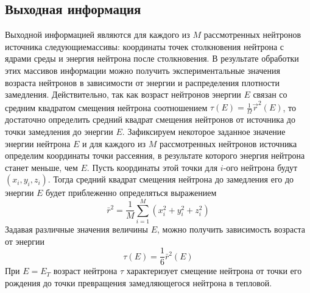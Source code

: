 \documentclass[a4paper]{article}
\begin{document}
    \subsection{Выходная информация}
    Выходной информацией являются для каждого из $M$
    рассмотренных нейтронов источника следующиемассивы: координаты
    точек столкновения нейтрона с ядрами среды и энергия нейтрона
    после столкновения. В результате обработки этих массивов
    информации можно получить экспериментальные значения возраста
    нейтронов в зависимости от энергии и распределения плотности
    замедления. Действительно, так как возраст нейтронов энергии
    $E$ связан со средним квадратом смещения нейтрона соотношением
    \(\tau(E)=\frac{1}{\Omega}\vec{r}^2(E)\), то достаточно
    определить средний квадрат смещения нейтронов от источника до
    точки замедления до энергии $E$. Зафиксируем некоторое заданное
    значение энергии нейтрона $E$ и для каждого из $M$ рассмотренных
    нейтронов источника определим координаты точки рассеяния, в
    результате которого энергия нейтрона станет меньше, чем $E$.
    Пусть координаты этой точки для $i$-ого нейтрона будут
    $(x_i, y_i, z_i)$. Тогда средний квадрат смещения нейтрона до
    замедления его до энергии $E$ будет приблеженно определяться
    выражением
    \begin{equation}\nonumber
        \bar{r}^2 = \frac{1}{M}\sum_{i=1}^{M}
        (x_i^2 + y_i^2 + z_i^2)
    \end{equation}
    Задавая различные значения величины $E$, можно получить
    зависимость возраста от энергии
    \begin{equation}\nonumber
        \tau(E)=\frac{1}{6}\bar{r}^2(E)
    \end{equation}
    При $E=E_T$ возраст нейтрона $\tau$ характеризует смещение
    нейтрона от точки его рождения до точки превращения замедляющегося
    нейтрона в тепловой.
\end{document}
